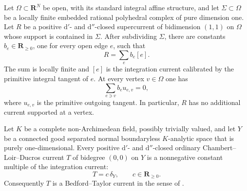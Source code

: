 \begin{lemma}
\label{lem:p213-euclidean-one-dimensional-current}
Let $\Omega\subset\mathbf R^N$ be open, with its standard integral affine
structure, and let $\Sigma\subset\Omega$ be a locally finite embedded
rational polyhedral complex of pure dimension one.  Let $R$ be a positive
$\mathrm d'$- and $\mathrm d''$-closed supercurrent of bidimension $(1,1)$
on $\Omega$ whose support is contained in $\Sigma$.  After subdividing
$\Sigma$, there are constants $b_e\in\mathbf R_{\geq0}$, one for every
open edge $e$, such that
\begin{equation}
                         R=\sum_e b_e[e].
 \label{eq:p213-euclidean-edge-decomposition}
\end{equation}
The sum is locally finite and $[e]$ is the integration current calibrated
by the primitive integral tangent of $e$.  At every vertex $v\in\Omega$
one has
\begin{equation}
                    \sum_{e\ni v}b_eu_{e,v}=0,
 \label{eq:p213-euclidean-vertex-balance}
\end{equation}
where $u_{e,v}$ is the primitive outgoing tangent.  In particular, $R$
has no additional current supported at a vertex.
\end{lemma}

\begin{proposition}
\label{prop:p213-normal-curve-arbitrary-valuation-current}
Let $K$ be a complete non-Archimedean field, possibly trivially valued,
and let $Y$ be a connected good separated normal boundaryless
$K$-analytic space that is purely one-dimensional.  Every positive
$\mathrm d'$- and $\mathrm d''$-closed ordinary Chambert--Loir--Ducros
current $T$ of bidegree $(0,0)$ on $Y$ is a nonnegative constant multiple
of the integration current:
\begin{equation}
                         T=c\,\delta_Y,
             \qquad c\in\mathbf R_{\geq0}.
 \label{eq:p213-normal-curve-arbitrary-classification}
\end{equation}
Consequently $T$ is a Bedford--Taylor current in the sense of
\cite[Definition~8.6.2]{CLD25}.
\end{proposition}

